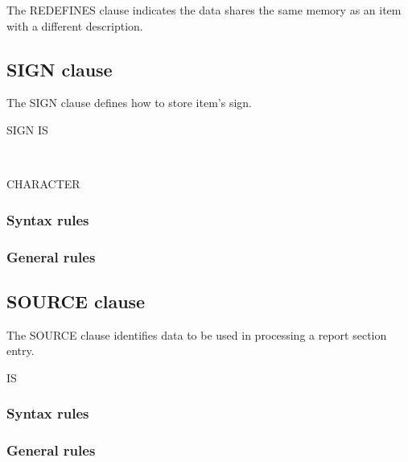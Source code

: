 The REDEFINES clause indicates the data shares the same memory as an item with a different description.

\begin{syntax}
   \identifier
\end{syntax}

\subsection{SIGN clause}

The SIGN clause defines how to store item's sign.

\begin{syntax}
  SIGN IS
  \begin{1=}
     \\
  \end{1=}
  \begin{0-1}
     CHARACTER
  \end{0-1}
\end{syntax}

\subsubsection{Syntax rules}

\subsubsection{General rules}

\subsection{SOURCE clause}

The SOURCE clause identifies data to be used in processing a report section entry.

\begin{syntax}
   IS 
  \begin{0-1}
  \end{0-1}
\end{syntax}

\subsubsection{Syntax rules}

\subsubsection{General rules}

